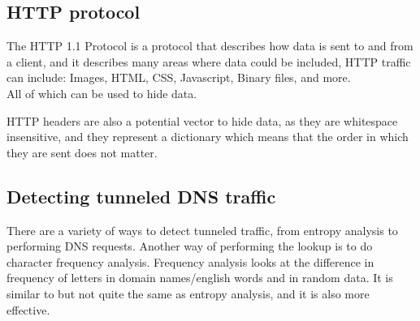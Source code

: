 \subsection{HTTP protocol}
The HTTP 1.1 Protocol\cite{rfc2616} is a protocol that describes how data is sent to and from a client, and it describes many areas where data could be included, HTTP traffic can include:
Images,
HTML,
CSS,
Javascript,
Binary files,
and more.\\
All of which can be used to hide data.\par
HTTP headers are also a potential vector to hide data, as they are whitespace insensitive, and they represent a dictionary which means that the order in which they are sent does not matter\cite{rfc2616}.

\subsection{Detecting tunneled DNS traffic}
There are a variety of ways to detect tunneled traffic, from entropy analysis to performing DNS requests\cite{detectingdns}.
Another way of performing the lookup is to do character frequency analysis\cite{freqanal}.
Frequency analysis looks at the difference in frequency of letters in domain names/english words and in random data. It is similar to but not quite the same as entropy analysis, and it is also more effective\cite{freqanal}.
